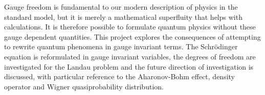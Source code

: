 Gauge freedom is fundamental to our modern description of physics in the
standard model, but it is merely a mathematical superfluity that helps with
calculations. It is therefore possible to formulate quantum physics without
these gauge dependent quantities. This project explores the consequences of
attempting to rewrite quantum phenomena in gauge invariant terms. The
Schr\"odinger equation is reformulated in gauge invariant variables, the degrees
of freedom are investigated for the Landau problem and the future direction of
investigation is discussed, with particular reference to the Aharonov-Bohm
effect, density operator and Wigner quasiprobability distribution.

